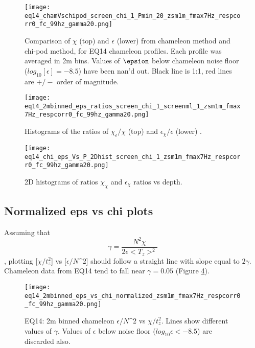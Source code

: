 \documentclass[11pt]{article}
\begin{document}
\begin{figure}[htbp]
\texttt{[image: eq14\_chamVschipod\_screen\_chi\_1\_Pmin\_20\_zsm1m\_fmax7Hz\_respcorr0\_fc\_99hz\_gamma20.png]}
\caption{Comparison of $\chi$ (top) and $\epsilon$ (lower) from chameleon method and chi-pod method, for EQ14 chameleon profiles. Each profile was averaged in 2m bins.  Values of $\epsion$ below chameleon noise floor ($log_{10}[\epsilon]=-8.5$) have been nan'd out. Black line is 1:1, red lines are $+/-$ order of magnitude. }
\label{2DchamVschi}
\end{figure}


\begin{figure}[htbp]
\texttt{[image: eq14\_2mbinned\_eps\_ratios\_screen\_chi\_1\_screenml\_1\_zsm1m\_fmax7Hz\_respcorr0\_fc\_99hz\_gamma20.png]}
\caption{Histograms of the ratios of $\chi_{\epsilon}/\chi$ (top) and $\epsilon_{\chi}/\epsilon$ (lower) .}
\label{histchamVschi}
\end{figure}



\begin{figure}[htbp]
\texttt{[image: eq14\_chi\_eps\_Vs\_P\_2Dhist\_screen\_chi\_1\_zsm1m\_fmax7Hz\_respcorr0\_fc\_99hz\_gamma20.png]}
\caption{ 2D histograms of ratios $\chi_{\chi}$ and $\epsilon_{\chi}$ ratios vs depth.}
\label{chamVschivsP}
\end{figure}





\clearpage
\subsection{Normalized eps vs chi plots}

Assuming that
\begin{equation}
\gamma=\frac{N^2 \chi}{2\epsilon<T_z>^2}
\end{equation}
, plotting [$\chi/t_{z}^{2}$] vs [$\epsilon/N\^2$] should follow a straight line with slope equal to $2\gamma$. Chameleon data from EQ14 tend to fall near $\gamma=0.05$ (Figure \ref{chiepsnorm}).


\begin{figure}[htbp]
\texttt{[image: eq14\_2mbinned\_eps\_vs\_chi\_normalized\_zsm1m\_fmax7Hz\_respcorr0\_fc\_99hz\_gamma20.png]}
\caption{EQ14: 2m binned  chameleon $\epsilon/N\^2$ vs $\chi/t_{z}^{2}$. Lines show different values of $\gamma$. Values of $\epsilon$ below noise floor ($log_{10}\epsilon<-8.5$) are discarded also.}
\label{chiepsnorm}
\end{figure}
\end{document}
